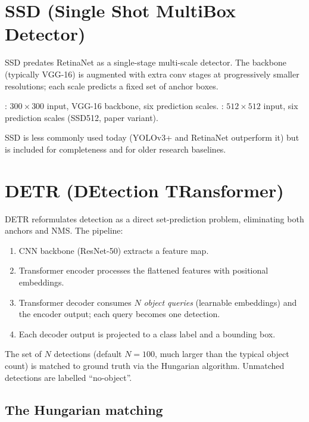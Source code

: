\section{SSD (Single Shot MultiBox Detector)}
\label{sec:detection_segmentation:ssd}

SSD \cite{liu_ssd_2016} predates RetinaNet as a single-stage
multi-scale detector. The backbone (typically VGG-16) is
augmented with extra conv stages at progressively smaller
resolutions; each scale predicts a fixed set of anchor boxes.

: $300 \times 300$ input, VGG-16 backbone, six
prediction scales.
: $512 \times 512$ input, six prediction scales
(SSD512, paper variant).

SSD is less commonly used today (YOLOv3+ and RetinaNet
outperform it) but is included for completeness and for older
research baselines.

\section{DETR (DEtection TRansformer)}
\label{sec:detection_segmentation:detr}

DETR \cite{carion_detr_2020} reformulates detection as a
direct set-prediction problem, eliminating both anchors and NMS.
The pipeline:

\begin{enumerate}
  \item CNN backbone (ResNet-50) extracts a feature map.
  \item Transformer encoder processes the flattened features
    with positional embeddings.
  \item Transformer decoder consumes $N$ \emph{object queries}
    (learnable embeddings) and the encoder output; each query
    becomes one detection.
  \item Each decoder output is projected to a class label and
    a bounding box.
\end{enumerate}

The set of $N$ detections (default $N = 100$, much larger than
the typical object count) is matched to ground truth via the
Hungarian algorithm. Unmatched detections are labelled
``no-object''.

\subsection{The Hungarian matching}
\label{ssec:detection_segmentation:hungarian}

